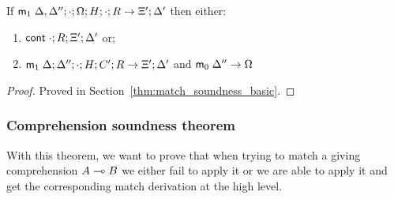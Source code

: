 If $\mathsf{m}_1 \; \Delta, \Delta''; \cdot; \Omega; H; \cdot; R \rightarrow \Xi'; \Delta'$ then either:
\begin{enumerate}
   \item $\mathsf{cont} \; \cdot; R; \Xi'; \Delta'$ or;
   \item $\mathsf{m}_1 \; \Delta; \Delta''; \cdot; H; C'; R \rightarrow \Xi'; \Delta'$ and $\mathsf{m}_0 \; \Delta'' \rightarrow \Omega$
\end{enumerate}

\begin{proof}
Proved in Section~\ref{thm:match_soundness_basic}.
\end{proof}

\subsubsection{Comprehension soundness theorem}

With this theorem, we want to prove that when trying to match a giving comprehension $A \multimap B$ we either fail to apply it or we are able to apply it and get the corresponding match derivation at the high level.

